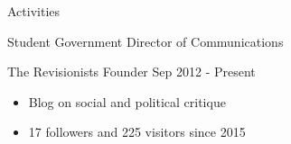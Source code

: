 \documentclass {vangogh500-resume}
\begin{document}
\begin{minipage}[t]{0.64\textwidth}
\begin {newcategory} {Activities}
\begin{job} {Student Government} {Director of Communications}
\begin{itemize}
			\end{itemize}
		\end {job}
		\begin{job} {The Revisionists} {Founder}
			Sep 2012 - Present
			\vspace{-\topsep}
			\begin{itemize}
				\itemsep1pt \parskip0pt 
				\item Blog on social and political critique
				\item 17 followers and 225 visitors since 2015
			\end{itemize}
		\end {job}
	\end {newcategory}
\end {minipage}
\end{document}
